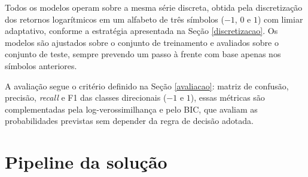 \documentclass[
    12pt,                %
    openright,           %
    oneside,             %
    a4paper,             %
    english,             %
    brazil               %
]{abntex2}
\begin{document}
Todos os modelos operam sobre a mesma série discreta, obtida pela discretização 
dos retornos logarítmicos em um alfabeto de três símbolos ($-1$, $0$ e $1$) com limiar adaptativo, 
conforme a estratégia apresentada na Seção \ref{discretizacao}.  
Os modelos são ajustados sobre o conjunto de treinamento e avaliados sobre o conjunto de teste, 
sempre prevendo um passo à frente com base apenas nos símbolos anteriores.

A avaliação segue o critério definido na Seção \ref{avaliacao}: matriz de confusão, precisão, 
\textit{recall} e F1 das classes direcionais ($-1$ e $1$), essas métricas são complementadas pela log-verossimilhança e pelo BIC, 
que avaliam as probabilidades previstas sem depender da regra de decisão adotada.

\section{Pipeline da solução}
\end{document}
